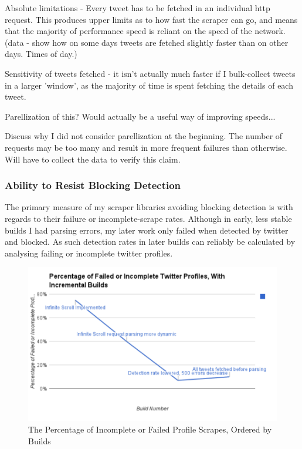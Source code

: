 Absolute limitations - Every tweet has to be fetched in an individual http request. This produces upper limits as to how fast the scraper can go, and means that the majority of performance speed is reliant on the speed of the network. (data - show how on some days tweets are fetched slightly faster than on other days. Times of day.)

Sensitivity of tweets fetched - it isn't actually much faster if I bulk-collect tweets in a larger 'window', as the majority of time is spent fetching the details of each tweet. 

Parellization of this? Would actually be a useful way of improving speeds...

Discuss why I did not consider parellization at the beginning. The number of requests may be too many and result in more frequent failures than otherwise. Will have to collect the data to verify this claim. 

\subsubsection{Ability to Resist Blocking Detection}

The primary measure of my scraper libraries avoiding blocking detection is with regards to their failure or incomplete-scrape rates. Although in early, less stable builds I had parsing errors, my later work only failed when detected by twitter and blocked. As such detection rates in later builds can reliably be calculated by analysing failing or incomplete twitter profiles. 

\begin{figure}[h!]
\centering
\includegraphics{Images/percentage_failed_incomplete_twitter_profiles.pdf}
\caption{The Percentage of Incomplete or Failed Profile Scrapes, Ordered by Builds}
\end{figure}

